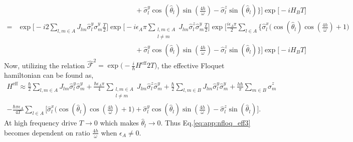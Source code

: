 \documentclass[%
reprint,
superscriptaddress,
amsmath,amssymb,showkeys,
aps,
prb,
]{revtex4-2}
\begin{document}
\begin{align}
		&\hspace{ 7cm}  +\hat{\sigma}^y_l \cos(\hat{\theta}_l)\sin(\frac{4h}{\omega})-\hat{\sigma}^z_l \sin(\hat{\theta}_l)\Big\}\Bigg]\exp\big[-i H_B T\big]\nonumber\\
		=&\exp\Bigg[-i2\sum_{l,m\in A}J_{lm}\hat{\sigma}^y_l\hat{\sigma}^y_m \frac{T}{2}\Bigg] \exp\Bigg[-i\epsilon_A \pi \sum_{\substack{l,m \in A\\l\neq m}}J_{lm} \hat{\sigma}^z_l\hat{\sigma}^y_m\frac{T}{2}\Bigg] \exp\Bigg[\frac{i \epsilon_A \pi}{2}\sum_{l\in A}\Bigg\{\hat{\sigma}^x_l\Bigg( \cos(\hat{\theta}_l)\cos(\frac{4h}{\omega})+1\Bigg)\nonumber\\
		&\hspace{7cm} +\hat{\sigma}^y_l \cos(\hat{\theta}_l)\sin(\frac{4h}{\omega})-\hat{\sigma}^z_l \sin(\hat{\theta}_l)\Bigg\}\Bigg] \exp\big[-i H_B T\big]
		\label{eq:floq_couple1}
	\end{align}
	Now, utilizing the relation $\displaystyle \hat{\mathcal{F}}^2 = \exp\Big(-\frac{i}{\hbar}H^{\mathrm{eff}}2T\Big)$, the effective Floquet hamiltonian can be found as,
	\begin{multline}
		H^{\mathrm{eff}} \approx\frac{\hbar}{2} \sum_{l,m\in A}J_{lm}\hat{\sigma}_l^y\hat{\sigma}_m^y +\frac{\hbar \epsilon_A \pi}{4} \sum_{\substack{l,m\in A\\l\neq m}} J_{lm}\hat{\sigma}^z_l\hat{\sigma}^y_m + \frac{\hbar}{2}\sum_{l,m\in B}J_{lm}\hat{\sigma}_l^y \hat{\sigma}_m^y + \frac{h\hbar}{\pi}\sum_{m \in B}\hat{\sigma}^z_m \\ -\frac{\hbar \pi \epsilon_A}{4T}\sum_{l\in A}\Bigg[\hat{\sigma}^x_l \Bigg(\cos(\hat{\theta}_l)\cos(\frac{4h}{\omega})+1 \Bigg) + \hat{\sigma}^y_l \cos(\hat{\theta}_l)\sin(\frac{4h}{\omega})-\hat{\sigma}^z_l \sin(\hat{\theta}_l)\Bigg].
		\label{eq:app:nfloq_eff3}
	\end{multline}
	At high frequency drive $T\rightarrow 0$ which makes $\hat{\theta}_l \rightarrow 0$. Thus  Eq.\eqref{eq:app:nfloq_eff3} becomes dependent on ratio $\frac{4h}{\omega}$ when $\epsilon_A \neq 0$.
	
	
	
\end{document}
